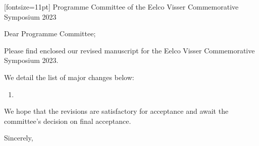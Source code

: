 \documentclass[UKenglish,final,a4paper,oneside]{scrlttr2}
\begin{document}
\begin{letter}[fontsize=11pt]%
  {%
    Programme Committee of the Eelco Visser Commemorative Symposium 2023
  }

  \opening{Dear Programme Committee;}

  Please find enclosed our revised manuscript for the Eelco Visser Commemorative Symposium 2023.

  We detail the list of major changes below:

  \begin{enumerate}
  \item
  \end{enumerate}

  We hope that the revisions are satisfactory for acceptance and await the committee's decision on final acceptance.

\closing{Sincerely,}
\end{letter}
\end{document}
